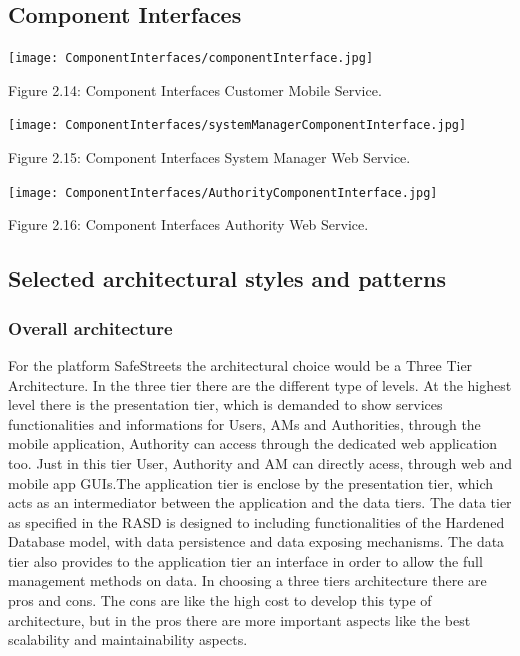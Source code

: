 \documentclass[12pt]{article}
\begin{document}
\newpage
\subsection{Component Interfaces}

\begin{center}
\texttt{[image: ComponentInterfaces/componentInterface.jpg]}


\vspace{2mm}
Figure 2.14: Component Interfaces Customer Mobile Service.
\end{center}
\newpage

\begin{center}
\texttt{[image: ComponentInterfaces/systemManagerComponentInterface.jpg]}


\vspace{2mm}
Figure 2.15: Component Interfaces System Manager Web Service.

\end{center}
\begin{center}
\texttt{[image: ComponentInterfaces/AuthorityComponentInterface.jpg]}


\vspace{2mm}
Figure 2.16: Component Interfaces Authority Web Service.
\end{center}
\newpage

\subsection{Selected architectural styles and patterns}
\vspace{5mm}
\subsubsection{Overall architecture}
For the platform SafeStreets the architectural choice would be a Three Tier Architecture. In the three tier there are the different type of levels. At the highest level there is the presentation tier, which is demanded to show services functionalities and informations for Users, AMs and Authorities, through the mobile application, Authority can access through the dedicated web application too. Just in this tier User, Authority and AM can directly acess, through web and mobile app GUIs.The application tier is enclose by the presentation tier, which acts as an intermediator between the application and the data tiers. The data tier as specified in the RASD is designed to including functionalities of the Hardened Database model, with data persistence and data exposing mechanisms. The data tier also provides to the application tier an interface in order to allow the full management methods on data.
In choosing a three tiers architecture there are pros and cons. The cons are like the high cost to develop this type of architecture, but in the pros there are more important aspects like the best scalability and maintainability aspects.
\end{document}
